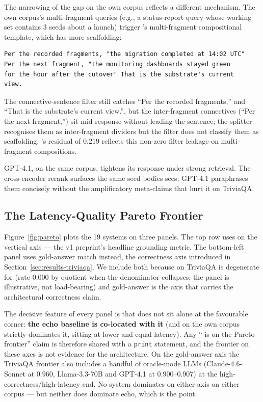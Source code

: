 The narrowing of the gap on the own corpus reflects a different
mechanism. The own corpus's multi-fragment queries (e.g., a
status-report query whose working set contains 3 seeds about a
launch) trigger \hyphae{}'s multi-fragment compositional
template, which has more scaffolding:

\begin{lstlisting}[caption={\hyphae{} response on the own-corpus
\texttt{dialogue-001} query.},
                    label={lst:hyphae-own}]
Per the recorded fragments, "the migration completed at 14:02 UTC"
Per the next fragment, "the monitoring dashboards stayed green
for the hour after the cutover" That is the substrate's current
view.
\end{lstlisting}

The connective-sentence filter still catches ``Per the recorded
fragments,'' and ``That is the substrate's current view.'', but
the inter-fragment connectives (``Per the next fragment,'') sit
mid-response without leading the sentence; the splitter recognises
them as inter-fragment dividers but the filter does not classify
them as scaffolding. \hyphae{}'s residual \unsupf{} of $0.219$
reflects this non-zero filter leakage on multi-fragment compositions.

GPT-4.1, on the same corpus, tightens its response under strong
retrieval. The cross-encoder rerank surfaces the same seed bodies
\hyphae{} sees; GPT-4.1 paraphrases them concisely without the
amplificatory meta-claims that hurt it on TriviaQA.

\subsection{The Latency-Quality Pareto Frontier}
\label{sec:pareto}

Figure~\ref{fig:pareto} plots the 19 systems on three panels.
The top row uses \unsupf{} on the vertical axis --- the v1
preprint's headline grounding metric. The bottom-left panel
uses gold-answer match instead, the correctness axis introduced
in Section~\ref{sec:results-triviaqa}. We include both because
\unsupf{} on TriviaQA is degenerate for \hyphae{} (rate $0.000$
by quotient when the denominator collapses; the panel is
illustrative, not load-bearing) and gold-answer is the axis
that carries the architectural correctness claim.

The decisive feature of every panel is that \hyphae{} does not
sit alone at the favourable corner: \textbf{the echo baseline is
co-located with it} (and on the own corpus strictly dominates it,
sitting at lower \unsupf{} and equal latency). Any ``\hyphae{} is
on the Pareto frontier'' claim is therefore shared with a
\texttt{print} statement, and the frontier on these axes is not
evidence for the architecture. On the gold-answer axis the
TriviaQA frontier also includes a handful of oracle-mode LLMs
(Claude-4.6-Sonnet at $0.960$, Llama-3.3-70B and GPT-4.1
at $0.900$--$0.907$) at the high-correctness/high-latency
end. No system dominates
\hyphae{} on either axis on either corpus --- but neither does
\hyphae{} dominate echo, which is the point.

